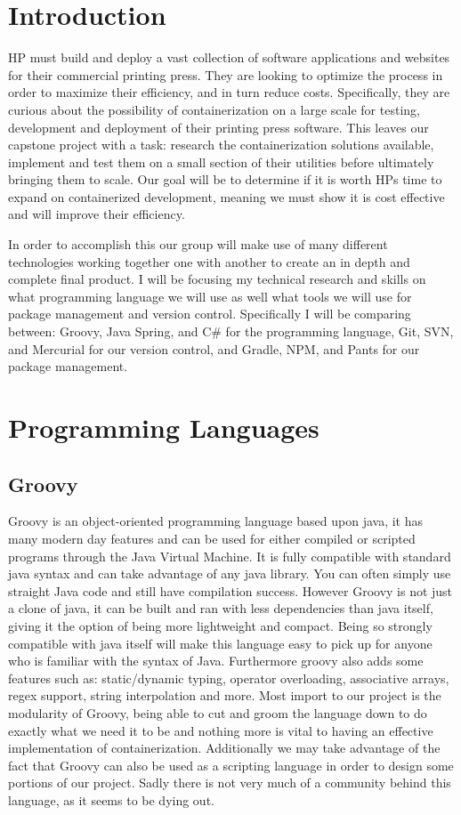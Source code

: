 \documentclass[onecolumn, draftclsnofoot,10pt, compsoc]{IEEEtran}
\begin{document}
\section{Introduction}
    HP must build and deploy a vast collection of software applications and websites for their commercial printing press. They are looking to optimize the process in order to maximize their efficiency, and in turn reduce costs. Specifically, they are curious about the possibility of containerization on a large scale for testing, development and deployment of their printing press software. This leaves our capstone project with a task: research the containerization solutions available, implement and test them on a small section of their utilities before ultimately bringing them to scale. Our goal will be to determine if it is worth HPs time to expand on containerized development, meaning we must show it is cost effective and will improve their efficiency.

    In order to accomplish this our group will make use of many different technologies working together one with another to create an in depth and complete final product. I will be focusing my technical research and skills on what programming language we will use as well what tools we will use for package management and version control. Specifically I will be comparing between: Groovy, Java Spring, and C\# for the programming language, Git, SVN, and Mercurial for our version control, and Gradle, NPM, and Pants for our package management.

\newpage
\section{Programming Languages}
\subsection{Groovy}
Groovy is an object-oriented programming language based upon java, it has many modern day features and can be used for either compiled or scripted programs through the Java Virtual Machine. It is fully compatible with standard java syntax and can take advantage of any java library. You can often simply use straight Java code and still have compilation success. However Groovy is not just a clone of java, it can be built and ran with less dependencies than java itself, giving it the option of being more lightweight and compact. Being so strongly compatible with java itself will make this language easy to pick up for anyone who is familiar with the syntax of Java. Furthermore groovy also adds some features such as: static/dynamic typing, operator overloading, associative arrays, regex support, string interpolation and more. Most import to our project is the modularity of Groovy, being able to cut and groom the language down to do exactly what we need it to be and nothing more is vital to having an effective implementation of containerization. Additionally we may take advantage of the fact that Groovy can also be used as a scripting language in order to design some portions of our project. Sadly there is not very much of a community behind this language, as it seems to be dying out.
\end{document}
